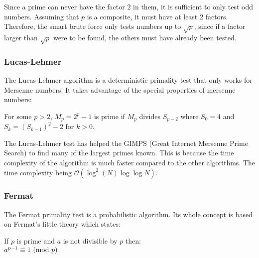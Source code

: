 \documentclass[main.tex]{subfiles}
\begin{document}
Since a prime can never have the factor $2$ in them, it is sufficient to only
test odd numbers. Assuming that $p$ is a composite, it must have at least 2
factors. Therefore, the smart brute force only tests numbers up to $\sqrt{p}$,
since if a factor larger than $\sqrt{p}$ were to be found, the others must have
already been tested. \newline



\subsubsection{Lucas-Lehmer}
The Lucas-Lehmer algorithm \cite{algh:lucas} is a deterministic primality test
that only works for Mersenne numbers. It takes advantage of the special
properties of mersenne numbers: \newline

\begin{mdframed}
  \begin{center}
    For some $p>2$, $M_p=2^p-1$ is prime if $M_p$ divides $S_{p-2}$ where $S_0=4$ and
    $S_k=(S_{k-1})^2-2$ for $k>0$.
  \end{center}
\end{mdframed}

The Lucas-Lehmer test has helped the GIMPS (Great Internet Mersenne Prime
Search) \cite{GIMPS} to find many of the largest primes known. This is because
the time complexity of the algorithm is much faster compared to the other
algorithms. The time complexity being $\mathcal{O}(\log^{2}(N) \log \log N)$. \\



\subsubsection{Fermat} \label{fermat} The Fermat primality test
\cite{algh:fermat} is a probabilistic algorithm. Its whole concept is based on
Fermat's little theory \cite{fermat:little} which states:

\begin{mdframed}
  \begin{center}
    If $p$ is prime and $a$ is not divisible by $p$ then: \\
    $a^{p - 1} \equiv 1 \ (\mathrm{mod}\ p)$
  \end{center}
\end{mdframed}
\end{document}
